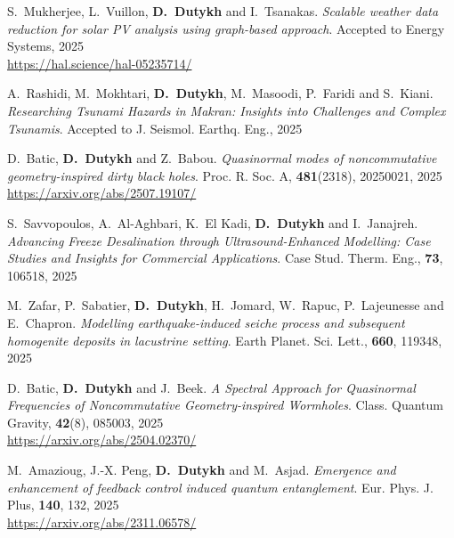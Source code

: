 \documentclass[final, a4paper, oneside, 12pt]{article}
\numberwithin{equation}{section}
\begin{document}
\begin{etaremune}

  

  \item S.~Mukherjee, L.~Vuillon, \textbf{D.~Dutykh} and I.~Tsanakas. \textit{Scalable weather data reduction for solar PV analysis using graph-based approach}. Accepted to Energy Systems, 2025 \\ %
  \url{https://hal.science/hal-05235714/}

  \item A.~Rashidi, M.~Mokhtari, \textbf{D.~Dutykh}, M.~Masoodi, P.~Faridi and S.~Kiani. \textit{Researching Tsunami Hazards in Makran: Insights into Challenges and Complex Tsunamis}. Accepted to J. Seismol. Earthq. Eng., 2025 %
  
  \item D.~Batic, \textbf{D.~Dutykh} and Z.~Babou. \textit{Quasinormal modes of noncommutative geometry-inspired dirty black holes}. Proc. R. Soc. A, \textbf{481}(2318), 20250021, 2025 \\ %
  \url{https://arxiv.org/abs/2507.19107/}

  \item S.~Savvopoulos, A.~Al-Aghbari, K.~El Kadi, \textbf{D.~Dutykh} and I.~Janajreh. \textit{Advancing Freeze Desalination through Ultrasound-Enhanced Modelling: Case Studies and Insights for Commercial Applications}. Case Stud. Therm. Eng., \textbf{73}, 106518, 2025 %

  \item M.~Zafar, P.~Sabatier, \textbf{D.~Dutykh}, H.~Jomard, W.~Rapuc, P.~Lajeunesse and E.~Chapron. \textit{Modelling earthquake-induced seiche process and subsequent homogenite deposits in lacustrine setting}. Earth Planet. Sci. Lett., \textbf{660}, 119348, 2025 %

  \item D.~Batic, \textbf{D.~Dutykh} and J.~Beek. \textit{A Spectral Approach for Quasinormal Frequencies of Noncommutative Geometry-inspired Wormholes}. Class. Quantum Gravity, \textbf{42}(8), 085003, 2025 \\ %
  \url{https://arxiv.org/abs/2504.02370/}

  \item M.~Amazioug, J.-X. Peng, \textbf{D.~Dutykh} and M.~Asjad. \textit{Emergence and enhancement of feedback control induced quantum entanglement}. Eur. Phys. J. Plus, \textbf{140}, 132, 2025 \\ %
  \url{https://arxiv.org/abs/2311.06578/}


\end{etaremune}
\end{document}
